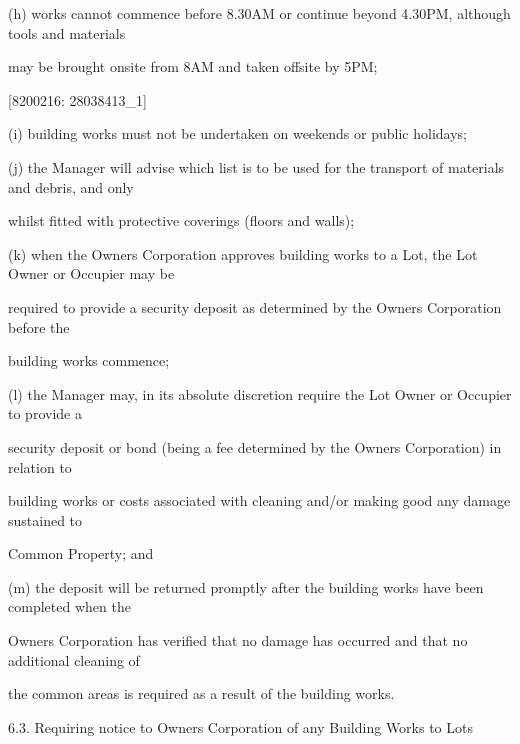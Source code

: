 \documentclass{article}
\begin{document}
{\fontsize{9.962}{1}(h) works cannot commence before 8.30AM or continue beyond 4.30PM, although tools and materials }

{\fontsize{10.02}{1}may be brought onsite from 8AM and taken offsite by 5PM; }

\newpage
















{\fontsize{7.02}{1}[8200216: 28038413\_1] }

{\fontsize{9.962}{1}(i) building works must not be undertaken on weekends or public holidays; }

{\fontsize{9.962}{1}(j) the Manager will advise which list is to be used for the transport of materials and debris, and only }

{\fontsize{10.02}{1}whilst fitted with protective coverings (floors and walls); }

{\fontsize{9.962}{1}(k) when the Owners Corporation approves building works to a Lot, the Lot Owner or Occupier may be }

{\fontsize{10.02}{1}required to provide a security deposit as determined by the Owners Corporation before the }

{\fontsize{10.02}{1}building works commence; }

{\fontsize{9.962}{1}(l) the Manager may, in its absolute discretion require the Lot Owner or Occupier to provide a }

{\fontsize{10.02}{1}security deposit or bond (being a fee determined by the Owners Corporation) in relation to }

{\fontsize{10.02}{1}building works or costs associated with cleaning and/or making good any damage sustained to }

{\fontsize{10.02}{1}Common Property; and }

{\fontsize{9.962}{1}(m) the deposit will be returned promptly after the building works have been completed when the }

{\fontsize{10.02}{1}Owners Corporation has verified that no damage has occurred and that no additional cleaning of }

{\fontsize{10.02}{1}the common areas is required as a result of the building works. }

{\fontsize{9.99}{1}6.3. Requiring notice to Owners Corporation of any Building Works to Lots }
\end{document}
